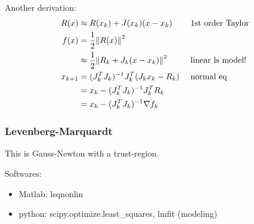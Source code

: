 \documentclass[class=article,crop=false]{standalone}
\begin{document}
Another derivation:
\begin{align*}
	R(x) &\approx R(x_k) + J(x_k) (x-x_k) && \text{ 1st order Taylor}\\ 
	f(x) &= \frac{1}{2} {\left\lVert{ R(x)}\right\rVert} ^2 \\
	     &\approx \frac{1}{2} {\left\lVert{ R_k + J_k(x-x_k)}\right\rVert}^2  && \text{ linear ls model!} \\
	x_{k+1}&= (J_k^{T} J_k)^{-1} J_k^{T} (J_k x_k - R_k) &&\text{ normal eq} \\
	       &= x_k - (J_k^{T} J_k)^{-1} J_k^{T} R_k\\
	       &= x_k- (J_k^{T} J_k)^{-1} \nabla f_k \\
\end{align*}
\subsubsection{Levenberg-Marquardt}

This is Gauss-Newton with a trust-region.

Softwares:

\begin{itemize}
	\item Matlab: lsqnonlin
	\item python: scipy.optimize.least\_squares, lmfit (modeling)
\end{itemize}
\end{document}
